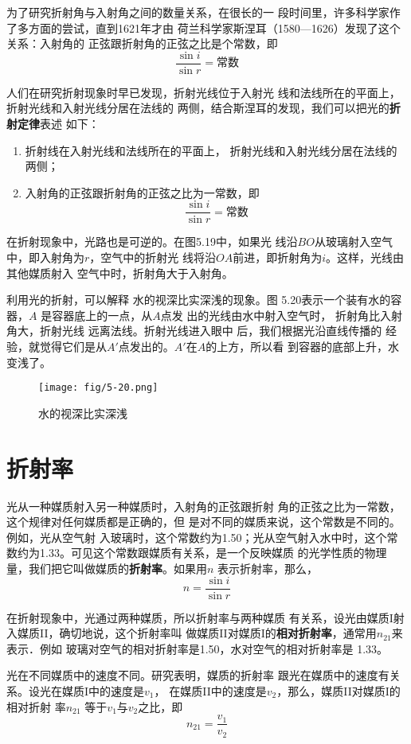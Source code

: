 为了研究折射角与入射角之间的数量关系，在很长的一
段时间里，许多科学家作了多方面的尝试，直到1621年才由
荷兰科学家斯涅耳（1580—1626）发现了这个关系：入射角的
正弦跟折射角的正弦之比是个常数，即
\[\frac{\sin i}{\sin r}=\text{常数}\]

人们在研究折射现象时早已发现，折射光线位于入射光
线和法线所在的平面上，折射光线和入射光线分居在法线的
两侧，结合斯涅耳的发现，我们可以把光的\textbf{折射定律}表述
如下：

\begin{enumerate}
    \item 折射线在入射光线和法线所在的平面上，
折射光线和入射光线分居在法线的两侧；
\item 入射角的正弦跟折射角的正弦之比为一常数，即
\[\frac{\sin i}{\sin r}=\text{常数}\]
\end{enumerate} 

在折射现象中，光路也是可逆的。在图5.19中，如果光
线沿$BO$从玻璃射入空气中，即入射角为$r$，空气中的折射光
线将沿$OA$前进，即折射角为$i$。这样，光线由其他媒质射入
空气中时，折射角大于入射角。

利用光的折射，可以解释
水的视深比实深浅的现象。图
5.20表示一个装有水的容器，$A$
是容器底上的一点，从$A$点发
出的光线由水中射入空气时，
折射角比入射角大，折射光线
远离法线。折射光线进入眼中
后，我们根据光沿直线传播的
经验，就觉得它们是从$A'$点发出的。$A'$在$A$的上方，所以看
到容器的底部上升，水变浅了。
\begin{figure}[htp]\centering
    \texttt{[image: fig/5-20.png]}
    \caption{水的视深比实深浅}
    \end{figure}

\section{折射率} 
    光从一种媒质射入另一种媒质时，入射角的正弦跟折射
    角的正弦之比为一常数，这个规律对任何媒质都是正确的，但
    是对不同的媒质来说，这个常数是不同的。例如，光从空气射
    入玻璃时，这个常数约为1.50；光从空气射入水中时，这个常
    数约为1.33。可见这个常数跟媒质有关系，是一个反映媒质
    的光学性质的物理量，我们把它叫做媒质的\textbf{折射率}。如果用$n$
    表示折射率，那么，
    \[n=\frac{\sin i}{\sin r}\]

    在折射现象中，光通过两种媒质，所以折射率与两种媒质
    有关系，设光由媒质I射入媒质II，确切地说，这个折射率叫
    做媒质II对媒质I的\textbf{相对折射率}，通常用$n_{21}$来表示．例如
    玻璃对空气的相对折射率是1.50，水对空气的相对折射率是
    1.33。

    光在不同媒质中的速度不同。研究表明，媒质的折射率
    跟光在媒质中的速度有关系。设光在媒质I中的速度是$v_1$，
    在媒质II中的速度是$v_2$，那么，媒质II对媒质I的相对折射
    率$n_{21}$
    等于$v_1$与$v_2$之比，即
\[n_{21}=\frac{v_1}{v_2} \]

